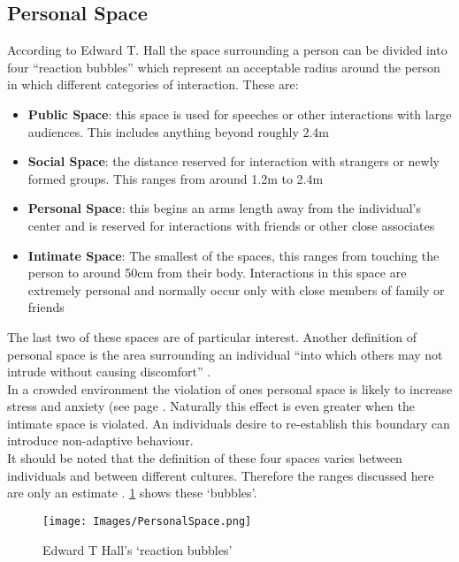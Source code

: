 \documentclass[a4paper,11pt]{article}
\begin{document}
\subsection{Personal Space}
\label{subsec:personalSpace}
According to Edward T. Hall \cite{HiddenDimension} the space surrounding a person can be divided into four ``reaction bubbles'' which represent an acceptable radius around the person in which different categories of interaction. These are:
\begin{itemize}
  \item{\textbf{Public Space}: this space is used for speeches or other interactions with large audiences. This includes anything beyond roughly 2.4m}
  \item{\textbf{Social Space}: the distance reserved for interaction with strangers or newly formed groups. This ranges from around 1.2m to 2.4m}
  \item{\textbf{Personal Space}: this begins an arms length away from the individual's center and is reserved for interactions with friends or other close associates}
  \item{\textbf{Intimate Space}: The smallest of the spaces, this ranges from touching the person to around 50cm from their body. Interactions in this space are extremely personal and normally occur only with close members of family or friends}
\end{itemize}
The last two of these spaces are of particular interest. Another definition of personal space is the area surrounding an individual ``into which others may not intrude without causing discomfort'' \cite[pg. 424]{HandbookOfPsychology5}.\\
In a crowded environment the violation of ones personal space is likely to increase stress and anxiety (see page \pageref{subsec:personalSpace}. Naturally this effect is even greater when the intimate space is violated. An individuals desire to re-establish this boundary can introduce non-adaptive behaviour.\\
It should be noted that the definition of these four spaces varies between individuals and between different cultures. Therefore the ranges discussed here are only an estimate \cite{ProxemicsWiki}. \ref{fig:personalSpace} shows these `bubbles'.

\begin{figure}
\centering
\texttt{[image: Images/PersonalSpace.png]}
\caption{Edward T Hall's `reaction bubbles'}
\label{fig:personalSpace}
\end{figure}
\end{document}
